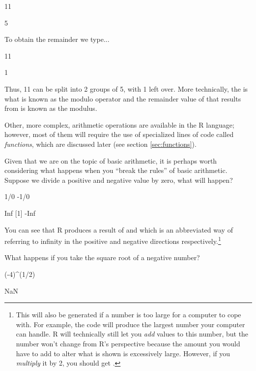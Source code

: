 \begin{inR}
11 %
\end{inR}

\begin{outR}
[1] 5
\end{outR}

To obtain the remainder we type...

\begin{inR}
11 %
\end{inR}

\begin{outR}
[1] 1
\end{outR}

Thus, 11 can be split into 2 groups of 5, with 1 left over.  More technically, the \R{\%\%} is what is known as the \gls{modulo operator} and the remainder value of  that results from  is known as the \gls{modulus}.

Other, more complex, arithmetic operations are available in the R language; however, most of them will require the use of specialized lines of code called \textit{functions}, which are discussed later (see section \ref{sec:functions}). 

Given that we are on the topic of basic arithmetic, it is perhaps worth considering what happens when you ``break the rules'' of basic arithmetic. Suppose we divide a positive and negative value by zero, what will happen?

\begin{inR}
1/0
-1/0
\end{inR}
\begin{outR}
[1] Inf
[1] -Inf
\end{outR}

\noindent
You can see that R produces a result of  and  which is an abbreviated way of referring to \gls{infinity} in the positive and negative directions respectively.\footnote{This will also be generated if a number is too large for a computer to cope with. For example, the code  will produce the largest number your computer can handle. R will technically still let you \textit{add} values to this number, but the number won't change from R's perspective because the amount you would have to add to alter what is shown is excessively large. However, if you \textit{multiply} it by 2, you should get .}

What happens if you take the square root of a negative number? 

\begin{inR}
(-4)^(1/2)
\end{inR}
\begin{outR}
[1] NaN
\end{outR}

